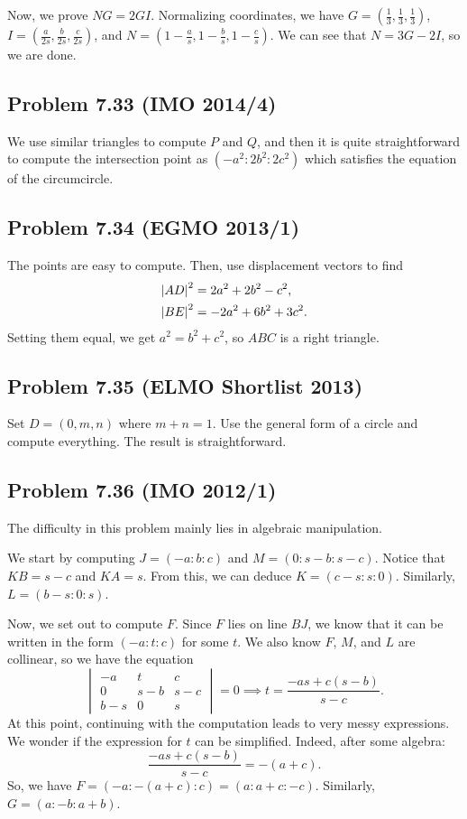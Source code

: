 \documentclass{scrartcl}
\begin{document}
Now, we prove $NG = 2GI$. Normalizing coordinates, we have $G = (\frac13, \frac13, \frac13)$, $I = (\frac{a}{2s}, \frac{b}{2s}, \frac{c}{2s})$, and $N = (1 - \frac{a}{s}, 1 - \frac{b}{s}, 1 - \frac{c}{s})$.
We can see that $N = 3G - 2I$, so we are done.
\subsection*{Problem 7.33 (IMO 2014/4)}
We use similar triangles to compute $P$ and $Q$, and then it is quite straightforward to compute the intersection point as $(-a^2:2b^2:2c^2)$ which satisfies the equation of the circumcircle.
\subsection*{Problem 7.34 (EGMO 2013/1)}
The points are easy to compute. Then, use displacement vectors to find
\begin{align*}
    \left\lvert AD \right\rvert^2 &= 2a^2 + 2b^2 - c^2, \\
    \left\lvert BE \right\rvert^2 &= -2a^2 + 6b^2 + 3c^2.
\end{align*}
Setting them equal, we get $a^2 = b^2 + c^2$, so $ABC$ is a right triangle.
\subsection*{Problem 7.35 (ELMO Shortlist 2013)}
Set $D = (0,m,n)$ where $m + n = 1$. Use the general form of a circle and compute everything. The result is straightforward.
\subsection*{Problem 7.36 (IMO 2012/1)}
The difficulty in this problem mainly lies in algebraic manipulation.

We start by computing $J = (-a : b : c)$ and $M = (0 : s-b : s-c)$.
Notice that $KB = s-c$ and $KA = s$. From this, we can deduce $K = (c-s : s : 0)$.
Similarly, $L = (b-s : 0 : s)$.

Now, we set out to compute $F$. Since $F$ lies on line $BJ$, we know that it can be written in the form $(-a : t : c)$ for some $t$. We also know $F$, $M$, and $L$ are collinear, so we have the equation
\[
\begin{vmatrix}
    -a & t & c \\
    0 & s-b & s-c \\
    b-s & 0 & s
\end{vmatrix}
= 0 \implies t = \frac{-as + c(s-b)}{s-c}.
\]
At this point, continuing with the computation leads to very messy expressions.
We wonder if the expression for $t$ can be simplified. Indeed, after some algebra:
\[ \frac{-as + c(s-b)}{s-c} = -(a+c). \]
So, we have $F = (-a : -(a+c) : c) = (a : a + c : -c)$. Similarly, $G = (a : -b : a + b)$.
\end{document}
